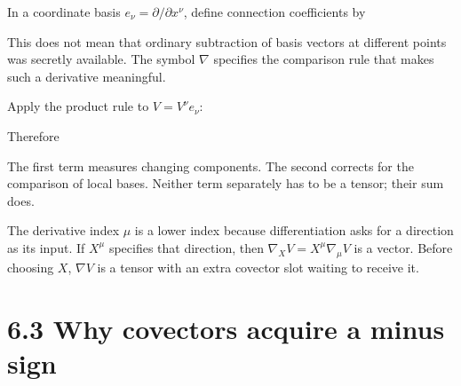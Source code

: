 \documentclass[
  11pt,
  letterpaper,
  oneside,
  openany]{scrbook}
\begin{document}
In a coordinate basis \(e_\nu=\partial/\partial x^\nu\), define
connection coefficients by

\begin{center}
\begingroup
{}
\ifdim\wd\grmathbox>\linewidth
\resizebox{\linewidth}{!}{\usebox{\grmathbox}}
\else\usebox{\grmathbox}\fi
\endgroup
\end{center}

This does not mean that ordinary subtraction of basis vectors at
different points was secretly available. The symbol \(\nabla\) specifies
the comparison rule that makes such a derivative meaningful.

Apply the product rule to \(V=V^\nu e_\nu\):

\begin{center}
\begingroup
{}
\ifdim\wd\grmathbox>\linewidth
\resizebox{\linewidth}{!}{\usebox{\grmathbox}}
\else\usebox{\grmathbox}\fi
\endgroup
\end{center}

Therefore

\begin{center}
\begingroup
{}
\ifdim\wd\grmathbox>\linewidth
\resizebox{\linewidth}{!}{\usebox{\grmathbox}}
\else\usebox{\grmathbox}\fi
\endgroup
\end{center}

The first term measures changing components. The second corrects for the
comparison of local bases. Neither term separately has to be a tensor;
their sum does.

The derivative index \(\mu\) is a lower index because differentiation
asks for a direction as its input. If \(X^\mu\) specifies that
direction, then \(\nabla_XV=X^\mu\nabla_\mu V\) is a vector. Before
choosing \(X\), \(\nabla V\) is a tensor with an extra covector slot
waiting to receive it.

\hypertarget{why-covectors-acquire-a-minus-sign}{%
\section{6.3 Why covectors acquire a minus
sign}\label{why-covectors-acquire-a-minus-sign}}
\end{document}
